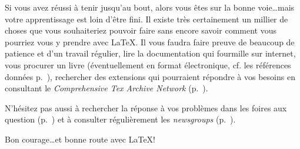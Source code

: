 Si vous avez réussi à tenir jusqu'au bout, alors vous êtes sur la
bonne voie\ldots mais votre apprentissage est loin d'être fini. Il
existe très certainement un millier de choses que vous souhaiteriez
pouvoir faire sans encore savoir comment vous pourriez vous y prendre
avec \LaTeX. Il vous faudra faire preuve de beaucoup de patience et
d'un travail régulier, lire la documentation qui fourmille sur
internet, vous procurer un livre (éventuellement en format
électronique, cf. les références données p.~\pageref{sec:freebooks}),
rechercher des extensions qui pourraient répondre à vos besoins en
consultant le \emph{Comprehensive Tex Archive Network}
(p.~\pageref{sec:websites}).

N'hésitez pas aussi à rechercher la réponse à vos problèmes dans les
foires aux question (p.~\pageref{sec:faq}) et à consulter
régulièrement les \emph{newsgroups} (p.~\pageref{sec:newsgroups}).

\vfill

\hfill Bon courage\ldots et bonne route avec \LaTeX !

\vfill
